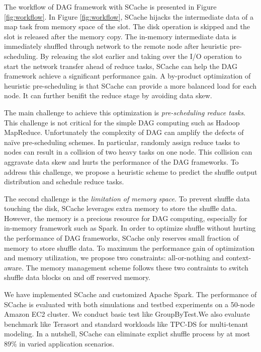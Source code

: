 The workflow of DAG framework with SCache is presented in Figure \ref{fig:workflow}. In Figure \ref{fig:workflow}, SCache hijacks the intermediate data of a map task from memory space of the slot. The disk operation is skipped and the slot is released after the memory copy. The in-memory intermediate data is immediately shuffled through network to the remote node after heuristic pre-scheduling. By releasing the slot earlier and taking over the I/O operation to start the network transfer ahead of reduce tasks, SCache can help the DAG framework achieve a significant performance gain. A by-product optimization of heuristic pre-scheduling is that SCache can provide a more balanced load for each node. It can further benifit the reduce stage by avoiding data skew.

The main challenge to achieve this optimization is \textit{pre-scheduling reduce tasks}. This challenge is not critical for the simple DAG computing such as Hadoop MapReduce\cite{mapreduce}. Unfortunately the complexity of DAG can amplify the defects of na\"{i}ve pre-scheduling schemes. In particular, randomly assign reduce tasks to nodes can result in a collision of two heavy tasks on one node. This collision can aggravate data skew and hurts the performance of the DAG frameworks. To address this challenge, we propose a heuristic scheme to predict the shuffle output distribution and schedule reduce tasks.

The second challenge is the \textit{limitation of memory space}. To prevent shuffle data touching the disk, SCache leverages extra memory to store the shuffle data. However, the memory is a precious resource for DAG computing, especially for in-memory framework such as Spark\cite{spark}. In order to optimize shuffle without hurting the performance of DAG frameworks, SCache only reserves small fraction of memory to store shuffle data. To maximum the performance gain of optimization and memory utilization, we propose two constraints: all-or-nothing and context-aware. The memory management scheme follows these two contraints to switch shuffle data blocks on and off reserved memory.

We have implemented SCache and customized Apache Spark\cite{apachespark}. The performance of SCache is evaluated with both simulations and testbed experiments on a 50-node Amazon EC2 cluster. We conduct basic test like GroupByTest.We also evaluate benchmark like Terasort\cite{spark-tera} and standard workloads like TPC-DS\cite{tpcds} for multi-tenant modeling. In a nutshell, SCache can eliminate explict shuffle process by at most $89\%$ in varied application scenarios.




